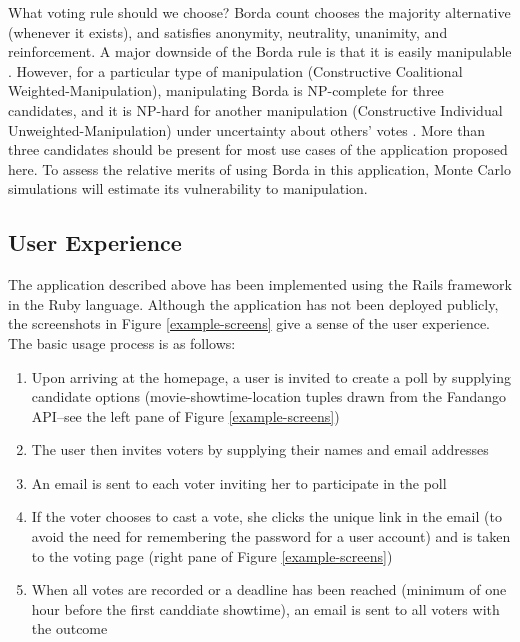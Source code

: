 \documentclass[12pt,letterpaper]{article} %
\begin{document}
What voting rule should we choose? Borda count chooses the majority alternative (whenever it exists), and satisfies anonymity, neutrality, unanimity, and reinforcement. A major downside of the Borda rule is that it is easily manipulable \citep{bartholdi1989computational}. However, for a particular type of manipulation (Constructive Coalitional Weighted-Manipulation), manipulating Borda is NP-complete for three candidates, and it is NP-hard for another manipulation (Constructive Individual Unweighted-Manipulation) under uncertainty about others' votes \citep{conitzer2007elections}. More than three candidates should be present for most use cases of the application proposed here. To assess the relative merits of using Borda in this application, Monte Carlo simulations will estimate its vulnerability to manipulation.


\subsection{User Experience}

The application described above has been implemented using the Rails framework in the Ruby language. Although the application has not been deployed publicly, the screenshots in Figure \ref{example-screens} give a sense of the user experience. The basic usage process is as follows:
\begin{enumerate}
\item Upon arriving at the homepage, a user is invited to create a poll by supplying candidate options (movie-showtime-location tuples drawn from the Fandango API--see the left pane of Figure \ref{example-screens})
\item The user then invites voters by supplying their names and email addresses
\item An email is sent to each voter inviting her to participate in the poll
\item If the voter chooses to cast a vote, she clicks the unique link in the email (to avoid the need for remembering the password for a user account) and is taken to the voting page (right pane of Figure \ref{example-screens})
\item When all votes are recorded or a deadline has been reached (minimum of one hour before the first canddiate showtime), an email is sent to all voters with the outcome
\end{enumerate}
\end{document}
